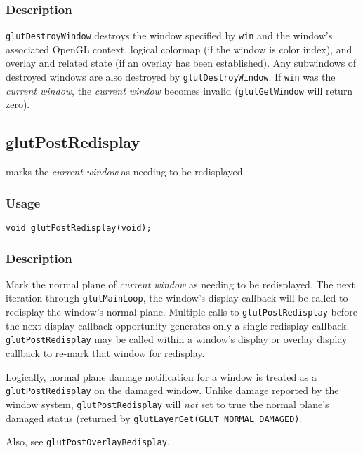 \subsubsection*{Description}

{\tt glutDestroyWindow} destroys the window specified by {\tt win} and the window's
associated OpenGL context, logical colormap (if the window is color index), and overlay
and related state (if an overlay has been established).  Any subwindows of destroyed
windows are also destroyed by {\tt glutDestroyWindow}.
If {\tt win} was
the {\em current window}, the {\em current window} becomes
invalid ({\tt glutGetWindow} will return zero).

\subsection{glutPostRedisplay}

 marks the {\em current window} as needing to be redisplayed.

\subsubsection*{Usage}
\begin{verbatim}
void glutPostRedisplay(void);
\end{verbatim}

\subsubsection*{Description}

Mark the normal plane of {\em current window} as needing to be redisplayed.  The next iteration
through {\tt glutMainLoop}, the window's display callback will be called
to redisplay the window's normal plane.  Multiple calls to {\tt glutPostRedisplay}
before the next display callback opportunity generates only a single
redisplay callback.  {\tt glutPostRedisplay} may be called within a window's
display or overlay display callback to re-mark that window for redisplay.

Logically, normal plane damage notification for a window is treated as a
{\tt glutPostRedisplay} on the damaged window.  Unlike damage reported by
the window system, {\tt glutPostRedisplay} will {\em not} set to true the normal
plane's damaged status (returned by {\tt glutLayerGet(GLUT\_NORMAL\_DAMAGED)}.

Also, see {\tt glutPostOverlayRedisplay}.

